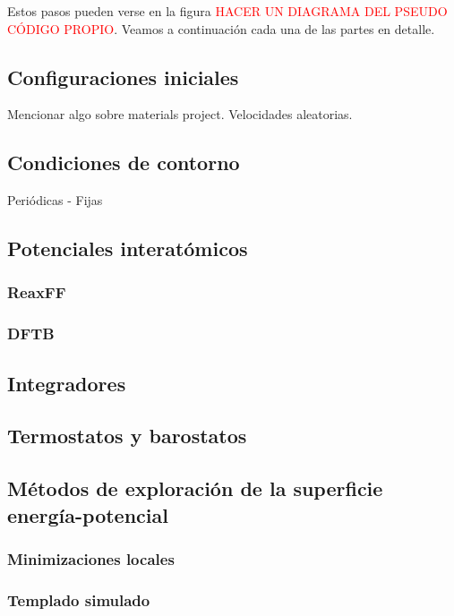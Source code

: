 Estos pasos pueden verse en la figura \textcolor{red}{HACER UN DIAGRAMA DEL PSEUDO 
CÓDIGO PROPIO}. Veamos a continuación cada una de las partes en detalle.

\subsection{Configuraciones iniciales}

Mencionar algo sobre materials project.
Velocidades aleatorias.

\subsection{Condiciones de contorno}

Periódicas - Fijas

\subsection{Potenciales interatómicos}

\subsubsection{ReaxFF}

\subsubsection{DFTB}

\subsection{Integradores}

\subsection{Termostatos y barostatos}

\subsection{Métodos de exploración de la superficie energía-potencial}

\subsubsection{Minimizaciones locales}

\subsubsection{Templado simulado}

